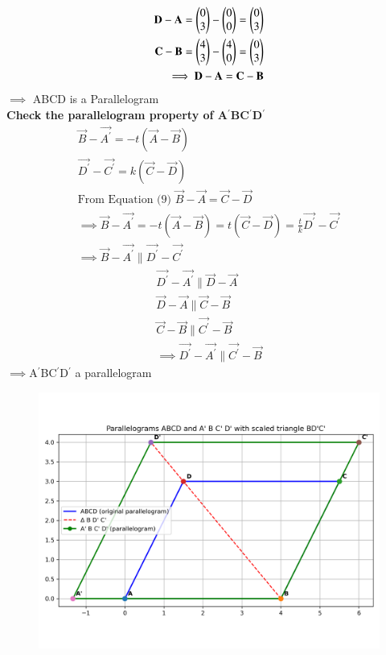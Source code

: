\documentclass[journal]{IEEEtran}
\begin{document}
\begin{align}
    \Vec{D}-\Vec{A}=\myvec{0\\3}-\myvec{0\\0}=\myvec{0\\3}\\
    \Vec{C}-\vec{B}=\myvec{4\\3}-\myvec{4\\0}=\myvec{0\\3}\\
\implies   \Vec{D}-\Vec{A}=  \Vec{C}-\vec{B}
\end{align}
$\implies$ ABCD is a Parallelogram\\ 
\textbf{Check the parallelogram property of A$^{\prime}$BC$^{\prime}$D$^{\prime}$ }\\
\begin{align}
    \vec{B}-\vec{A^{\prime}}=-t(\vec{A}-\vec{B})\\
    \vec{D^{\prime}}-\vec{C^{\prime}}=k(\vec{C}-\vec{D})\\
    \text{From Equation (9) }\Vec{B}-\Vec{A}=\Vec{C}-\Vec{D}\\
\implies \vec{B}-\vec{A^{\prime}}=-t(\vec{A}-\vec{B})=t(\vec{C}-\vec{D})=\frac{t}{k}\vec{D^{\prime}}-\vec{C^{\prime}}\\
\implies \vec{B}-\vec{A^{\prime}} \parallel \vec{D^{\prime}}-\vec{C^{\prime}}
\end{align}
    \begin{align}
    \vec{D^{\prime}}-\vec{A^{\prime}} \parallel \vec{D}-\vec{A}\\
    \vec{D}-\vec{A} \parallel \Vec{C}-\vec{B}\\
     \Vec{C}-\vec{B} \parallel \Vec{C^{\prime}}-\Vec{B}\\
\implies \vec{D^{\prime}}-\vec{A^{\prime}} \parallel \Vec{C^{\prime}}-\Vec{B}
\end{align}
$\implies$A$^{\prime}$BC$^{\prime}$D$^{\prime}$ a parallelogram
\begin{figure}[H]
    \centering
    \includegraphics[width=1.0\columnwidth]{figs/01.png}
    \label{fig-1}
\end{figure}
\end{document}
